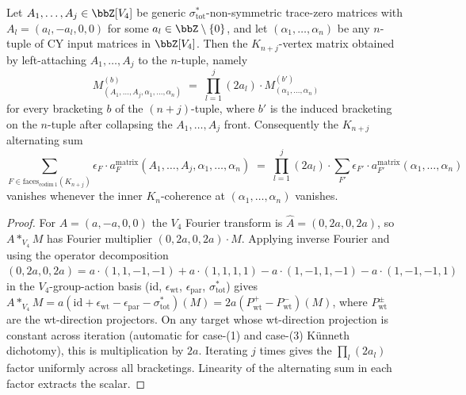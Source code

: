 \begin{lemma}
\label{lem:universal-generic-front-extension}
Let $A_1, \ldots, A_j \in \bbZ[V_4]$ be generic
$\sigma_{\mathrm{tot}}^*$-non-symmetric trace-zero matrices with
$A_l = (a_l, -a_l, 0, 0)$ for some $a_l \in \bbZ \setminus \{0\}$, and let
$(\alpha_1, \ldots, \alpha_n)$ be any $n$-tuple of CY input matrices in
$\bbZ[V_4]$. Then the $K_{n+j}$-vertex matrix obtained by left-attaching
$A_1, \ldots, A_j$ to the $n$-tuple, namely
\[
 M_{(A_1, \ldots, A_j, \alpha_1, \ldots, \alpha_n)}^{(b)}
 \;=\; \prod_{l = 1}^{j} (2 a_l) \cdot M_{(\alpha_1, \ldots, \alpha_n)}^{(b')}
\]
for every bracketing $b$ of the $(n+j)$-tuple, where $b'$ is the induced
bracketing on the $n$-tuple after collapsing the $A_1, \ldots, A_j$ front.
Consequently the $K_{n+j}$ alternating sum
\[
 \sum_{F \in \mathrm{faces}_{\mathrm{codim}\ 1}(K_{n+j})} \epsilon_F
 \cdot a^{\mathrm{matrix}}_F(A_1, \ldots, A_j, \alpha_1, \ldots, \alpha_n)
 \;=\; \prod_{l=1}^{j}(2 a_l) \cdot \sum_{F'} \epsilon_{F'}
 \cdot a^{\mathrm{matrix}}_{F'}(\alpha_1, \ldots, \alpha_n)
\]
vanishes whenever the inner $K_n$-coherence at $(\alpha_1, \ldots, \alpha_n)$
vanishes.
\end{lemma}

\begin{proof}
For $A = (a, -a, 0, 0)$ the $V_4$ Fourier transform is
$\hat A = (0, 2a, 0, 2a)$, so $A *_{V_4} M$ has Fourier multiplier
$(0, 2a, 0, 2a) \cdot \hat M$. Applying inverse Fourier and using the
operator decomposition
$(0, 2a, 0, 2a) = a \cdot (1, 1, -1, -1) + a \cdot (1, 1, 1, 1) - a \cdot (1, -1, 1, -1) - a \cdot (1, -1, -1, 1)$
in the $V_4$-group-action basis (id, $\epsilon_{\mathrm{wt}}$,
$\epsilon_{\mathrm{par}}$, $\sigma_{\mathrm{tot}}^*$) gives
$A *_{V_4} M = a (\mathrm{id} + \epsilon_{\mathrm{wt}} - \epsilon_{\mathrm{par}} - \sigma_{\mathrm{tot}}^*)(M) = 2a (P^+_{\mathrm{wt}} - P^-_{\mathrm{wt}})(M)$,
where $P^{\pm}_{\mathrm{wt}}$ are the wt-direction projectors. On any
target whose wt-direction projection is constant across iteration
\textup{(}automatic for case-(1) and case-(3) Künneth dichotomy\textup{),}
this is multiplication by $2a$. Iterating $j$ times gives the
$\prod_l (2 a_l)$ factor uniformly across all bracketings. Linearity of
the alternating sum in each factor extracts the scalar.
\end{proof}

